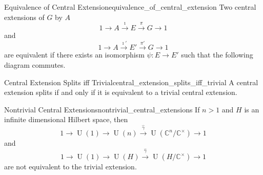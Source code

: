\documentclass{article}
\begin{document}
\begin{definition}{Equivalence of Central Extension}{equivalence_of_central_extension}
    Two central extensions of $G$ by $A$
    \[ 1 \rightarrow A \xrightarrow{\imath} E \xrightarrow{\pi} G \rightarrow 1 \]
    and
    \[ 1 \rightarrow A \xrightarrow{\imath'} E' \xrightarrow{\pi'} G \rightarrow 1 \]
    are equivalent if there exists an isomorphism $\psi:E\rightarrow E'$ such that the following diagram commutes.
    \begin{center}
    \end{center}
\end{definition}

\begin{lemma}{Central Extension Splits iff Trivial}{central_extension_splits_iff_trivial}
    A central extension splits if and only if it is equivalent to a trivial central extension.
\end{lemma}

\begin{example}{Nontrivial Central Extensions}{nontrivial_central_extensions}
    If $n>1$ and $H$ is an infinite dimensional Hilbert space, then
    \[ 1 \rightarrow \operatorname{U}(1) \rightarrow \operatorname{U}(n) \xrightarrow{\hat{\gamma}} \operatorname{U}(\mathbb{C}^n/\mathbb{C}^\times)\rightarrow 1 \]
    and
    \[ 1 \rightarrow \operatorname{U}(1) \rightarrow \operatorname{U}(H) \xrightarrow{\hat{\gamma}} \operatorname{U}(H/\mathbb{C}^\times)\rightarrow 1 \]
    are not equivalent to the trivial extension.
\end{example}
\end{document}
